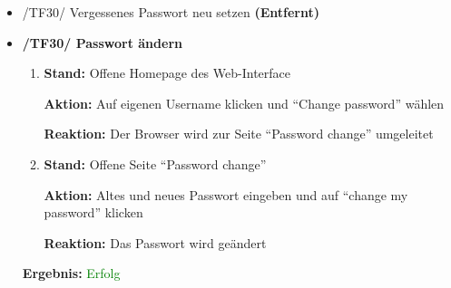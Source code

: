 \documentclass[a4paper]{scrreprt}
\begin{document}
\begin{itemize}
                \item /TF30/ Vergessenes Passwort neu setzen \textbf{(Entfernt)}
		        \vspace*{0.6cm}
		        
				\item \textbf{/TF30/ Passwort \"andern}
                        \begin{enumerate}
                            \item \par \textbf{Stand: }Offene Homepage des Web-Interface
                                \par \textbf{Aktion: }Auf eigenen Username klicken und ``Change password'' w\"ahlen
                                \par \textbf{Reaktion: }Der Browser wird zur Seite ``Password change'' umgeleitet
							\item \par \textbf{Stand: }Offene Seite ``Password change''
                                \par \textbf{Aktion: }Altes und neues Passwort eingeben und auf ``change my password'' klicken
                                \par \textbf{Reaktion: }Das Passwort wird ge\"andert                                
                        \end{enumerate}		         
		           \vspace*{0.3cm}
		           \par \textbf{Ergebnis: }\textcolor{green}{Erfolg}
		           \vspace*{0.6cm}		        
		           

\end{itemize}
\end{document}
